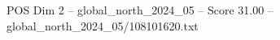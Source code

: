 \begin{textsample}{POS Dim 2 – global\_north\_2024\_05 – Score 31.00 – global\_north\_2024\_05/108101620.txt}
\end{textsample}
